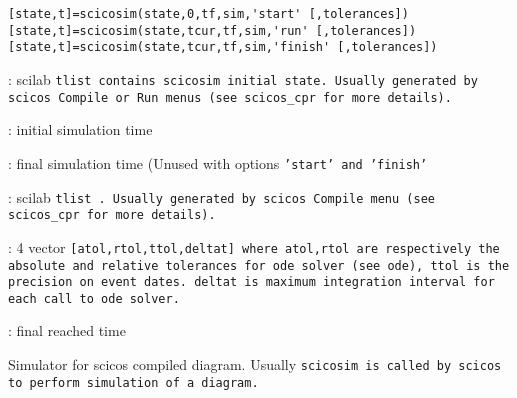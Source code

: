 


%
%


\label{scicosim}

\begin{verbatim}
[state,t]=scicosim(state,0,tf,sim,'start' [,tolerances])
[state,t]=scicosim(state,tcur,tf,sim,'run' [,tolerances])
[state,t]=scicosim(state,tcur,tf,sim,'finish' [,tolerances])
\end{verbatim}
\begin{scitem}
\item[{\verb?state?}]
: scilab %
\tt tlist %
\rm contains scicosim  initial state. Usually generated by scicos
%
\tt Compile %
\rm or %
\tt Run %
\rm menus (see scicos\_cpr for more details).
\item[{\verb?tcur ?}]
: initial simulation  time
\item[{\verb?tf?}]
: final simulation time (Unused with options  %
\tt 'start' %
\rm and  %
\tt 'finish' %
\rm \item[{\verb?sim?}]
: scilab %
\tt tlist%
\rm .  Usually generated by scicos
%
\tt Compile %
\rm menu (see scicos\_cpr  for more details). 
\item[{\verb?tolerances?}]
: 4 vector %
\tt [atol,rtol,ttol,deltat] %
\rm where %
\tt atol,rtol %
\rm  are respectively the
absolute and relative tolerances for ode solver (see ode), %
\tt ttol %
\rm is the precision on event dates.  %
\tt deltat %
\rm is maximum integration
interval for each call to ode solver.
\item[{\verb?t?}]
: final reached time
\end{scitem}%
Simulator for scicos compiled diagram. Usually %
\tt scicosim %
\rm is
called by %
\tt scicos %
\rm to perform simulation of a diagram. 

